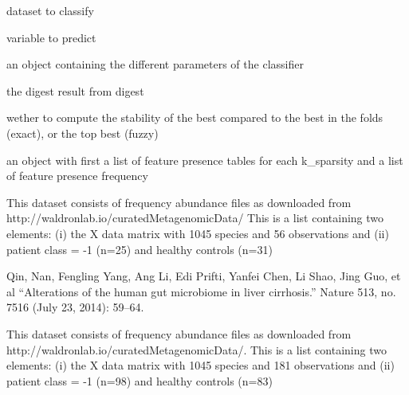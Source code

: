 \documentclass[a4paper]{book}
\begin{document}
\begin{Arguments}
\begin{ldescription}
\item[\code{X:}] dataset to classify

\item[\code{y:}] variable to predict

\item[\code{clf:}] an object containing the different parameters of the classifier

\item[\code{digested.result:}] the digest result from digest

\item[\code{method:}] wether to compute the stability of the best compared to the best in the folds (exact), or the top best (fuzzy)
\end{ldescription}
\end{Arguments}
%
\begin{Value}
an object with first a list of feature presence tables for each k\_sparsity and a list of feature presence frequency
\end{Value}
%
\begin{Description}
This dataset consists of frequency abundance files as downloaded from http://waldronlab.io/curatedMetagenomicData/
This is a list containing two elements: (i) the X data matrix with 1045 species and 56 observations and (ii) patient class = -1 (n=25) and healthy controls (n=31)
\end{Description}
%
\begin{Author}
Qin, Nan, Fengling Yang, Ang Li, Edi Prifti, Yanfei Chen, Li Shao, Jing Guo, et al “Alterations of the human gut microbiome in liver cirrhosis.” Nature 513, no. 7516 (July 23, 2014): 59–64.
\end{Author}
%
\begin{Description}
This dataset consists of frequency abundance files as downloaded from http://waldronlab.io/curatedMetagenomicData/. 
This is a list containing two elements: (i) the X data matrix with 1045 species and 181 observations and (ii) patient class = -1 (n=98) and healthy controls (n=83)
\end{Description}
\end{document}
